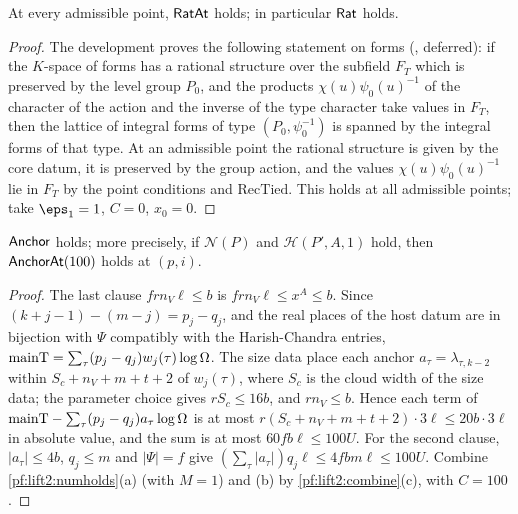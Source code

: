 \begin{proposition}[Rationality]\label{pf:lift2:rat}
At every admissible point, $\mathsf{RatAt}$ holds; in particular $\mathsf{Rat}$ holds.
\end{proposition}

\begin{proof}
The development proves the following statement on forms
(, deferred): if the $K$-space of forms has a
rational structure over the subfield $F_T$ which is preserved by the level group $P_0$, and the products
$\chi(u)\psi_0(u)^{-1}$ of the character of the action and the inverse of the type character take values in $F_T$, then
the lattice of integral forms of type $(P_0,\psi_0^{-1})$ is spanned by the integral forms of that type. At an
admissible point the rational structure is given by the core datum, it is preserved by the group action, and the
values $\chi(u)\psi_0(u)^{-1}$ lie in $F_T$ by the point conditions and $\mathrm{RecTied}$. This holds at all
admissible points; take $\eps_1=1$, $C=0$, $x_0=0$.
\end{proof}

\begin{proposition}\label{pf:lift2:anchor}
$\mathsf{Anchor}$ holds; more precisely, if $\mathcal N(P)$ and $\mathcal H(P',A,1)$ hold, then
$\mathsf{AnchorAt}(100)$ holds at $(p,i)$.
\end{proposition}

\begin{proof}
The last clause $frn_V\ell\le b$ is $frn_V\ell\le x^A\le b$. Since $(k+j-1)-(m-j)=p_j-q_j$, and the real places of the
host datum are in bijection with $\Psi$ compatibly with the Harish-Chandra entries,
$\mathrm{mainT}=\sum_{\tau}(p_j-q_j)w_j(\tau)\log\Omega$. The size data place each anchor $a_\tau=\lambda_{\tau,k-2}$
within $S_c+n_V+m+t+2$ of $w_j(\tau)$, where $S_c$ is the cloud width of the size data; the parameter choice gives
$rS_c\le16b$, and $rn_V\le b$. Hence each term of $\mathrm{mainT}-\sum_\tau(p_j-q_j)a_\tau\log\Omega$ is at most
$r(S_c+n_V+m+t+2)\cdot3\ell\le20b\cdot3\ell$ in absolute value, and the sum is at most $60fb\ell\le100U$. For the
second clause, $|a_\tau|\le4b$, $q_j\le m$ and $|\Psi|=f$ give $(\sum_\tau|a_\tau|)q_j\ell\le4fbm\ell\le100U$. Combine
\cref{pf:lift2:numholds}(a) (with $M=1$) and (b) by \cref{pf:lift2:combine}(c), with $C=100$.
\end{proof}

